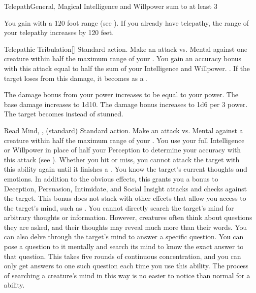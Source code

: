   \begin{magicalfeat}{Telepath}{General, Magical}
    \featpre Intelligence and Willpower sum to at least 3

     You gain  with a 120 foot range (see ).
    If you already have telepathy, the range of your telepathy increases by 120 feet.

    \begin{magicalactiveability}{Telepathic Tribulation}[]
      \abilityusagetime Standard action.
      \rankline
      Make an attack vs. Mental against one creature within half the maximum range of your .
      You gain an accuracy bonus with this attack equal to half the sum of your Intelligence and Willpower.
      \hit \damagerankone.
      If the target loses  from this damage, it becomes \stunned as a .

      \rankline
       The damage bonus from your power increases to be equal to your power.
       The base damage increases to 1d10.
       The damage bonus increases to 1d6 per 3 power.
       The target becomes \confused instead of stunned.
    \end{magicalactiveability}

    \begin{magicalsustainability}{Read Mind}{, ,  (standard)}
      \abilityusagetime Standard action.
      \rankline
      Make an attack vs. Mental against a creature within half the maximum range of your .
      You use your full Intelligence or Willpower in place of half your Perception to determine your accuracy with this attack (see ).
      Whether you hit or miss, you cannot attack the target with this ability again until it finishes a .
      \hit You know the target's current thoughts and emotions.
      In addition to the obvious effects, this grants you a  bonus to Deception, Persuasion, Intimidate, and Social Insight attacks and checks against the target.
      This bonus does not stack with other effects that allow you access to the target's mind, such as .
      You cannot directly search the target's mind for arbitrary thoughts or information.
      However, creatures often think about questions they are asked, and their thoughts may reveal much more than their words.
      \crit You can also delve through the target's mind to answer a specific question.
      You can pose a question to it mentally and search its mind to know the exact answer to that question.
      This takes five rounds of continuous concentration, and you can only get answers to one such question each time you use this ability.
      The process of searching a creature's mind in this way is no easier to notice than normal for a  ability.


\end{magicalsustainability}
\end{magicalfeat}
